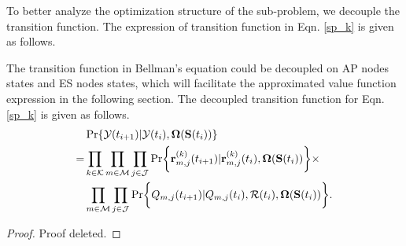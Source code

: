 
To better analyze the optimization structure of the sub-problem, we decouple the transition function. The expression of transition function in Eqn. \ref{sp_k} is given as follows.
\begin{lemma}
    The transition function in Bellman's equation could be decoupled on AP nodes states and ES nodes states, which will facilitate the approximated value function expression in the following section.
    The decoupled transition function for Eqn. \ref{sp_k} is given as follows.
    \begin{align}
        & \Pr\{\Obsv(t_{i+1})|\Obsv(t_{i}), \Policy(\Stat(t_{i}))\}
        \nonumber\\
        =& \prod_{k\in\apSet}\prod_{m\in\esSet}\prod_{j\in\jSpace}
                \Pr\Brace{
                    \vec{r}^{(k)}_{m,j}(t_{i+1})|\vec{r}^{(k)}_{m,j}(t_{i}), \Policy(\Stat(t_{i}))
                }
                \times  
            \nonumber\\
            & \prod_{m\in\esSet}\prod_{j\in\jSpace}
                \Pr\Brace{
                    Q_{m,j}(t_{i+1})|Q_{m,j}(t_{i}), \mathcal{R}(t_{i}), \Policy(\Stat(t_{i}))
                }.
    \end{align}
\end{lemma}
\begin{proof}
    Proof deleted.
\end{proof}

